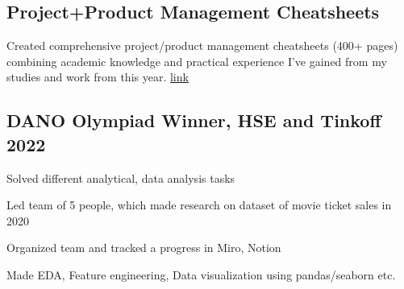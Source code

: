 \documentclass[a4paper, 12pt]{article}
\begin{document}
\subsection {{Project+Product Management Cheatsheets}}
\begin{zitemize}
\item Created comprehensive project/product management cheatsheets (400+ pages) combining academic knowledge and practical experience I've gained from my studies and work from this year.
\href{http://slavikss.github.io/blog/}{link}
\end{zitemize}

\subsection{{DANO Olympiad Winner, HSE and Tinkoff }\hfill 2022}
\begin{zitemize}
\item Solved different analytical, data analysis tasks
\item Led team of 5 people, which made research on dataset of movie ticket sales in 2020
\item Organized team and tracked a progress in Miro, Notion
\item Made EDA, Feature engineering, Data visualization using pandas/seaborn etc.
\end{zitemize}
\end{document}
